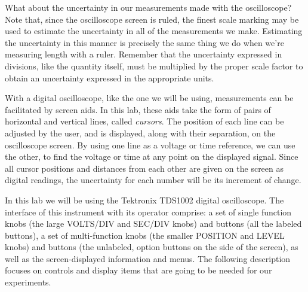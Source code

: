 What about the uncertainty in our measurements made with the oscilloscope? 
Note that, since the oscilloscope screen is ruled, the finest scale marking 
may be used to estimate the uncertainty in all of the measurements we make.  
Estimating the uncertainty in this manner is precisely the same thing we do
when we're measuring length with a ruler. Remember that the uncertainty 
expressed in divisions, like the quantity itself, must be multiplied by the 
proper scale factor to obtain an uncertainty expressed in the appropriate 
units.

With a digital oscilloscope, like the one we will be using, measurements can
be facilitated by screen aids. In this lab, these aids take the form of pairs
of horizontal and vertical lines, called {\it cursors}. The position of each
line can be adjusted by the user, and is displayed, along with their separation,
on the oscilloscope screen. By using one line as a voltage or time reference,
we can use the other, to find the voltage or time at any point on the
displayed signal. Since all cursor positions and distances from each other are
given on the screen as digital readings, the uncertainty for each number will
be its increment of change.

In this lab we will be using the Tektronix TDS1002 digital oscilloscope.
The interface of this instrument with its operator comprise: a set of
single function knobs (the large VOLTS/DIV and SEC/DIV knobs) and buttons
(all the labeled buttons), a set of multi-function knobs (the smaller
POSITION and LEVEL knobs) and buttons (the unlabeled, option buttons on the
side of the screen), as well as the screen-displayed information and menus.
The following description focuses on controls and display items that are going
to be needed for our experiments. 

